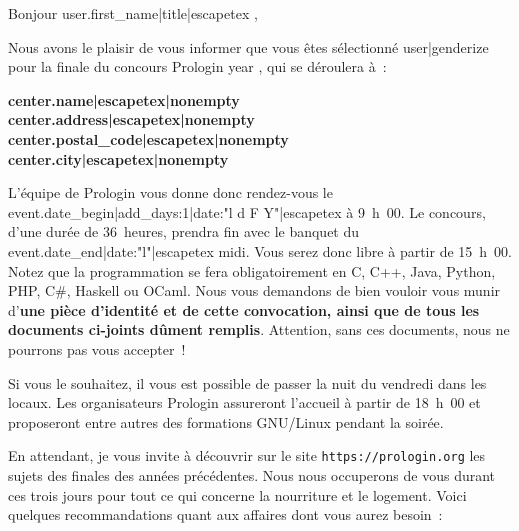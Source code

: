 \documentclass[a4paper,11pt]{article}
\begin{document}
\def\objet{Convocation à la finale Prologin {{ year }} }

{%
{%

\def\destinataire{%
{{ user.get_full_name|title|escapetex|nonempty }}\\
{{ user.country|escapetex|nonempty }}\\
{{ user.address|escapetex|nonempty }}\\
{{ user.postal_code|escapetex|nonempty }} {{ user.city|escapetex|nonempty }}%
}
\header

Bonjour {{ user.first_name|title|escapetex }},

Nous avons le plaisir de vous informer que vous êtes
sélectionné{{ user|genderize }}
pour la finale du concours Prologin {{ year }}, qui se déroulera à~:

{\par\smallskip\noindent\centering
\begin{minipage}{0.5\textwidth}
\textbf{%
{{ center.name|escapetex|nonempty }}%
}\\
\textbf{%
{{ center.address|escapetex|nonempty }}%
}\\
\textbf{%
{{ center.postal_code|escapetex|nonempty }} {{ center.city|escapetex|nonempty }}%
}
\end{minipage}
\par\smallskip}

L'équipe de Prologin vous donne donc rendez-vous le {{ event.date_begin|add_days:1|date:"l d F Y"|escapetex }}
à 9~h~00. Le concours, d'une durée de 36~heures, prendra fin avec le banquet du
{{ event.date_end|date:"l"|escapetex }} midi. Vous serez donc libre à partir de 15~h~00. Notez que la
programmation se fera obligatoirement en C, C++, Java, Python, PHP, C\#,
Haskell ou OCaml. Nous vous demandons de bien vouloir vous munir d'\textbf{une
pièce d'identité et de cette convocation, ainsi que de tous les documents
ci-joints dûment remplis}. Attention, sans ces documents, nous ne pourrons pas
vous accepter~!

Si vous le souhaitez, il vous est possible de passer la nuit du vendredi dans
les locaux. Les organisateurs Prologin assureront l'accueil à partir de 18~h~00
et proposeront entre autres des formations GNU/Linux pendant la soirée.

En attendant, je vous invite à découvrir sur le site
\texttt{https://prologin.org} les sujets des finales des années précédentes.
Nous nous occuperons de vous durant ces trois jours pour tout ce qui concerne
la nourriture et le logement. Voici quelques recommandations quant aux affaires
dont vous aurez besoin~:

}}
\end{document}

